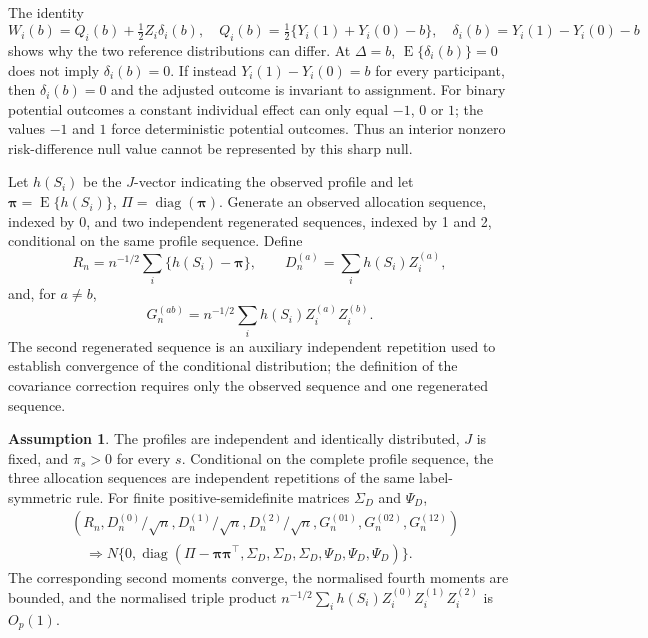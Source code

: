 \documentclass[12pt,a4paper]{article}
\theoremstyle{definition}
\newtheorem{assumption}{Assumption}
\newcommand{\E}{\operatorname E}
\newcommand{\diag}{\operatorname{diag}}
\begin{document}
The identity
\begin{equation}\label{eq:Qdelta-identity}
 W_i(b)=Q_i(b)+\tfrac12Z_i\delta_i(b),\quad
 Q_i(b)=\tfrac12\{Y_i(1)+Y_i(0)-b\},\quad
 \delta_i(b)=Y_i(1)-Y_i(0)-b
\end{equation}
shows why the two reference distributions can differ. At $\Delta=b$, $\E\{\delta_i(b)\}=0$ does not imply $\delta_i(b)=0$. If instead $Y_i(1)-Y_i(0)=b$ for every participant, then $\delta_i(b)=0$ and the adjusted outcome is invariant to assignment. For binary potential outcomes a constant individual effect can only equal $-1$, $0$ or $1$; the values $-1$ and $1$ force deterministic potential outcomes. Thus an interior nonzero risk-difference null value cannot be represented by this sharp null.

Let $h(S_i)$ be the $J$-vector indicating the observed profile and let $\bm\pi=\E\{h(S_i)\}$, $\Pi=\diag(\bm\pi)$. Generate an observed allocation sequence, indexed by 0, and two independent regenerated sequences, indexed by 1 and 2, conditional on the same profile sequence. Define
\[
 R_n=n^{-1/2}\sum_i\{h(S_i)-\bm\pi\},\qquad
 D_n^{(a)}=\sum_i h(S_i)Z_i^{(a)},
\]
and, for $a\ne b$,
\begin{equation}\label{eq:G-general}
 G_n^{(ab)}=n^{-1/2}\sum_i h(S_i)Z_i^{(a)}Z_i^{(b)}.
\end{equation}
The second regenerated sequence is an auxiliary independent repetition used to establish convergence of the conditional distribution; the definition of the covariance correction requires only the observed sequence and one regenerated sequence.

\begin{assumption}\label{ass:main-general-allocation}
The profiles are independent and identically distributed, $J$ is fixed, and $\pi_s>0$ for every $s$. Conditional on the complete profile sequence, the three allocation sequences are independent repetitions of the same label-symmetric rule. For finite positive-semidefinite matrices $\Sigma_D$ and $\Psi_D$,
\begin{align}\label{eq:general-alloc-clt}
 &(R_n,D_n^{(0)}/\sqrt n,D_n^{(1)}/\sqrt n,D_n^{(2)}/\sqrt n,
 G_n^{(01)},G_n^{(02)},G_n^{(12)})\nonumber\\
 &\quad\Rightarrow N\{0,\diag(\Pi-\bm\pi\bm\pi^\top,
 \Sigma_D,\Sigma_D,\Sigma_D,\Psi_D,\Psi_D,\Psi_D)\}.
\end{align}
The corresponding second moments converge, the normalised fourth moments are bounded, and the normalised triple product $n^{-1/2}\sum_i h(S_i)Z_i^{(0)}Z_i^{(1)}Z_i^{(2)}$ is $O_p(1)$.
\end{assumption}
\end{document}
